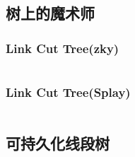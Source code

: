 \documentclass[landscape, twoside, a4paper]{article}
\newcommand{\cppcode}[1]{
	\inputminted[mathescape,
	frame=lines,linenos]{cpp}{source/#1}
}
\begin{document}
\begin{multicols}{2}
\begin{spacing}{0.8}
\subsection{树上的魔术师}








\subsubsection{Link Cut Tree(zky)}

\cppcode{data-structure/LCT.cpp}


\subsubsection{Link Cut Tree(Splay)}

\cppcode{data-structure/Link-cut-tree.cpp}








\subsection{可持久化线段树}

\cppcode{data-structure/ChairTree.cpp}




\end{spacing}
\end{multicols}
\end{document}
